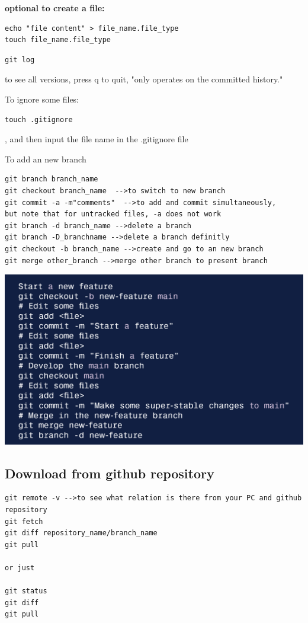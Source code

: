 \documentclass[UTF8]{article}
\begin{document}
\textbf{optional to create a file:}
\begin{verbatim}
echo "file content" > file_name.file_type
touch file_name.file_type
\end{verbatim}

\begin{verbatim}
git log 
\end{verbatim} to see all versions, press q to quit, "only operates on the committed history." 

To ignore some files:
\begin{verbatim}
touch .gitignore
\end{verbatim}, and then input the file name in the .gitignore file

To add an new branch
\begin{verbatim}
git branch branch_name
git checkout branch_name  -->to switch to new branch
git commit -a -m"comments"  -->to add and commit simultaneously, 
but note that for untracked files, -a does not work
git branch -d branch_name -->delete a branch
git branch -D_branchname -->delete a branch definitly
git checkout -b branch_name -->create and go to an new branch
git merge other_branch -->merge other branch to present branch
\end{verbatim}
\begin{center}
\includegraphics[scale=0.6]{gitmerge}
\end{center}
\subsection{Download from github repository}

\begin{verbatim}
git remote -v -->to see what relation is there from your PC and github repository
git fetch 
git diff repository_name/branch_name
git pull 

or just

git status
git diff
git pull

\end{verbatim}
\end{document}

